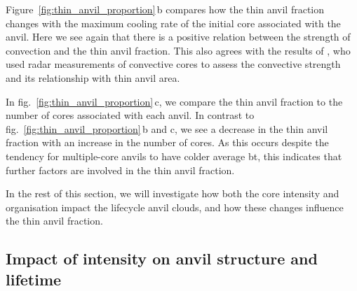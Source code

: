 Figure~\ref{fig:thin_anvil_proportion}\,b compares how the thin anvil fraction changes with the maximum cooling rate of the initial core associated with the anvil.
Here we see again that there is a positive relation between the strength of convection and the thin anvil fraction.
This also agrees with the results of \citet{takahashi_relationships_2017}, who used radar measurements of convective cores to assess the convective strength and its relationship with thin anvil area.

In fig.~\ref{fig:thin_anvil_proportion}\,c, we compare the thin anvil fraction to the number of cores associated with each anvil.
In contrast to fig.~\ref{fig:thin_anvil_proportion}\,b and c, we see a decrease in the thin anvil fraction with an increase in the number of cores.
As this occurs despite the tendency for multiple-core anvils to have colder average \acrshort{bt}, this indicates that further factors are involved in the thin anvil fraction.

In the rest of this section, we will investigate how both the core intensity and organisation impact the lifecycle anvil clouds, and how these changes influence the thin anvil fraction.

\subsection{Impact of intensity on anvil structure and lifetime}

